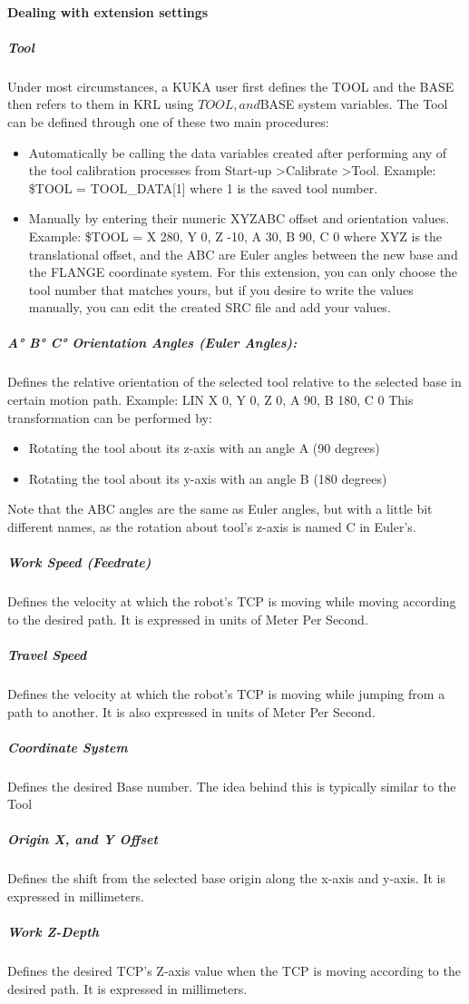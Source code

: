 \paragraph{Dealing with extension settings}
\subparagraph{Tool}
Under most circumstances, a KUKA user first defines the TOOL and the BASE then refers to them in KRL using $TOOL, and $BASE system variables. The Tool can be defined through one of these two main procedures:
\begin{itemize}
	\item 	Automatically be calling the data variables created after performing any of the tool calibration processes from Start-up \textgreater Calibrate \textgreater Tool. Example: \$TOOL = TOOL\_DATA[1] where 1 is the saved tool number.
	\item Manually by entering their numeric XYZABC offset and orientation values. Example: \$TOOL = {X 280, Y 0, Z -10, A 30, B 90, C 0} where XYZ is the translational offset, and the ABC are Euler angles between the new base and the FLANGE coordinate system.
	For this extension, you can only choose the tool number that matches yours, but if you desire to write the values manually, you can edit the created SRC file and add your values.
\end{itemize}
\subparagraph{A° B° C° Orientation Angles (Euler Angles):}
Defines the relative orientation of the selected tool relative to the selected base in certain motion path. Example: LIN {X 0, Y 0, Z 0, A 90, B 180, C 0}
This transformation can be performed by:

\begin{itemize}
	\item Rotating the tool about its z-axis with an angle A (90 degrees)
	\item Rotating the tool about its y-axis with an angle B (180 degrees)
\end{itemize}
Note that the ABC angles are the same as Euler angles, but with a little bit different names, as the rotation about tool’s z-axis is named C in Euler’s.
\subparagraph{Work Speed (Feedrate)}
Defines the velocity at which the robot's TCP is moving while moving according to the desired path. It is expressed in units of Meter Per Second.
\subparagraph{Travel Speed}
Defines the velocity at which the robot's TCP is moving while jumping from a path to another. It is also expressed in units of Meter Per Second.
\subparagraph{Coordinate System}
Defines the desired Base number. The idea behind this is typically similar to the Tool
\subparagraph{Origin X, and Y Offset}
Defines the shift from the selected base origin along the x-axis and y-axis. It is expressed in millimeters.
\subparagraph{Work Z-Depth}
Defines the desired TCP's Z-axis value when the TCP is moving according to the desired path. It is expressed in millimeters.

